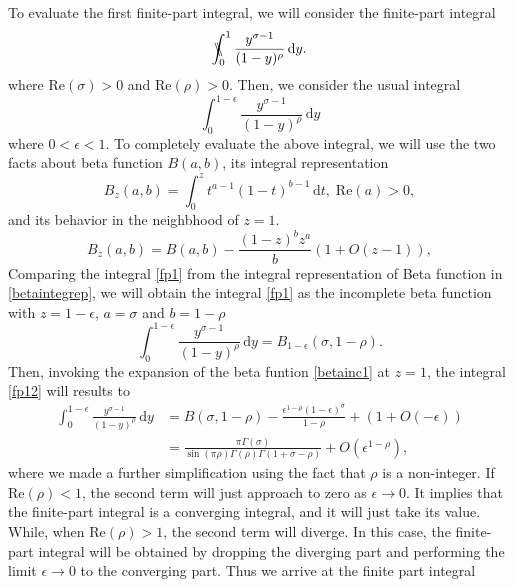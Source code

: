 To evaluate the first finite-part integral, we will consider the finite-part integral 
\begin{equation}
\bbint{0}{1}\frac{y^{\sigma-1}}{(1-y)^{\rho}}\,\mathrm{d}y.
\end{equation}
where $\mathrm{Re}(\sigma)>0$ and $\mathrm{Re}(\rho)>0$. Then, we consider the usual integral 
\begin{equation} \label{fp1}
\int_0^{1-\epsilon} \frac{y^{\sigma-1}}{(1-y)^{\rho}}\,\mathrm{d}y
\end{equation} 
where $0<\epsilon<1$. To completely evaluate the above integral, we will use the two facts about beta function $B(a,b)$, its integral representation
\begin{equation}\label{betaintegrep}
B_{z}(a,b) = \int_0^z t^{a-1} (1-t)^{b-1}\,\mathrm{d}t,\; \mathrm{Re}(a)>0,
\end{equation}
and its behavior in the neighbhood of $z=1$.
\begin{equation}\label{betainc1}
B_z(a,b)= B(a,b) - \frac{(1-z)^{b} z^a}{b}\left(1+O(z-1)\right),
\end{equation}
Comparing the integral \eqref{fp1} from the integral representation of Beta function in \eqref{betaintegrep}, we will obtain the integral \eqref{fp1} as the incomplete beta function with $z=1-\epsilon$, $a=\sigma$ and $b=1-\rho$
\begin{equation} \label{fp12}
    \int_{0}^{1-\epsilon} \frac{y^{\sigma-1}}{(1-y)^{\rho}} \,\mathrm{d}y = B_{1-\epsilon}(\sigma, 1-\rho).
\end{equation}
Then, invoking the expansion of the beta funtion \eqref{betainc1} at $z=1$, the integral \eqref{fp12} will results to
\begin{align}
    \int_0^{1-\epsilon} \frac{y^{\sigma-1}}{(1-y)^{\rho}}\,\mathrm{d}y & = B(\sigma, 1-\rho) - \frac{\epsilon^{1-\rho} (1-\epsilon)^{\sigma}}{1-\rho} + \left(1+O(-\epsilon)\right)
    \\& =\frac{\pi\Gamma(\sigma)}{\sin(\pi\rho) \Gamma(\rho) \Gamma(1+\sigma-\rho)} + O(\epsilon^{1-\rho}),
\end{align}
where we made a further simplification using the fact that $\rho$ is a non-integer. If $\mathrm{Re}(\rho)<1$, the second term will just approach to zero as $\epsilon \to 0$. It implies that the finite-part integral is a converging integral, and it will just take its value. While, when $\mathrm{Re}(\rho)>1$, the second term will diverge. In this case, the finite-part integral will be obtained by dropping the diverging part and performing the limit $\epsilon \to 0$ to the converging part. Thus we arrive at the finite part integral

